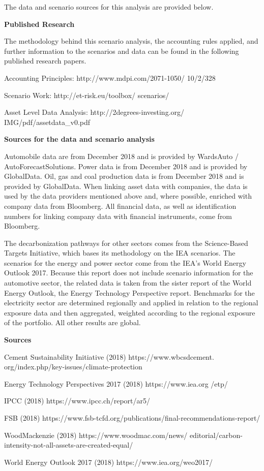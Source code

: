 \documentclass[10pt,table,a4]{article}\usepackage[]{graphicx}\usepackage[]{color}
\begin{document}
	\begin{multicols}{2}
		The data and scenario sources for this analysis are provided below. 
		
		\textbf{Published Research}
		
		The methodology behind this scenario analysis, the accounting rules applied, and further information to the scenarios and data can be found in the following published research papers. 
		
		Accounting Principles: http://www.mdpi.com/2071-1050/ 10/2/328 
		
		Scenario Work: http://et-risk.eu/toolbox/ scenarios/ 
		
		Asset Level Data Analysis: http://2degrees-investing.org/ IMG/pdf/assetdata\_v0.pdf
		
		\textbf{Sources for the data and scenario analysis}
		
		Automobile data are from December 2018 and is provided by WardsAuto / AutoForecastSolutions. Power data is from December 2018 and is provided by GlobalData. Oil, gas and coal production data is from December 2018 and is provided by GlobalData. When linking asset data with companies, the data is used by the data providers mentioned above and, where possible, enriched with company data from Bloomberg. All financial data, as well as identification numbers for linking company data with financial instruments, come from Bloomberg. 
		
		The decarbonization pathways for other sectors comes from the Science-Based Targets Initiative, which bases its methodology on the IEA scenarios. The scenarios for the energy and power sector come from the IEA's World Energy Outlook 2017. Because this report does not include scenario information for the automotive sector, the related data is taken from the sister report of the World Energy Outlook, the Energy Technology Perspective report. Benchmarks for the electricity sector are determined regionally and applied in relation to the regional exposure data and then aggregated, weighted according to the regional exposure of the portfolio. All other results are global.
		
		\textbf{Sources}
		
		Cement Sustainability Initiative (2018) https://www.wbcsdcement. org/index.php/key-issues/climate-protection
		
		Energy Technology Perspectives 2017 (2018) https://www.iea.org /etp/
		
		IPCC (2018) https://www.ipcc.ch/report/ar5/
		
		FSB (2018) https://www.fsb-tcfd.org/publications/final-recommendations-report/
		
		WoodMackenzie (2018) https://www.woodmac.com/news/ editorial/carbon-intensity-not-all-assets-are-created-equal/ 
		
		World Energy Outlook 2017 (2018) https://www.iea.org/weo2017/
		
	\end{multicols}
	
	\newpage
	
	
\end{document}
